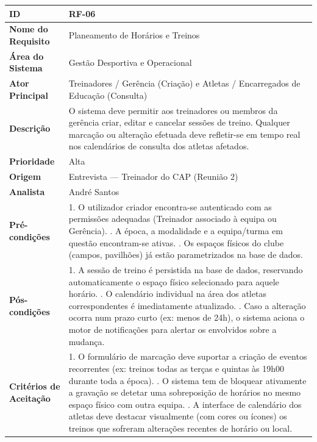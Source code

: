 {\begin{xltabular}{\textwidth}{|l|X|}
\textbf{ID} & RF-06 \\ \hline
\textbf{Nome do Requisito} & Planeamento de Horários e Treinos \\ \hline
\textbf{Área do Sistema} & Gestão Desportiva e Operacional \\ \hline
\textbf{Ator Principal} & Treinadores / Gerência (Criação) e Atletas / Encarregados de Educação (Consulta) \\ \hline
\textbf{Descrição} & O sistema deve permitir aos treinadores ou membros da gerência criar, editar e cancelar sessões de treino. Qualquer marcação ou alteração efetuada deve refletir-se em tempo real nos calendários de consulta dos atletas afetados. \\ \hline
\textbf{Prioridade} & Alta \\ \hline
\textbf{Origem} & Entrevista --- Treinador do CAP (Reunião 2) \\ \hline
\textbf{Analista} & André Santos \\ \hline
\textbf{Pré-condições} & 1. O utilizador criador encontra-se autenticado com as permissões adequadas (Treinador associado à equipa ou Gerência). . A época, a modalidade e a equipa/turma em questão encontram-se ativas. . Os espaços físicos do clube (campos, pavilhões) já estão parametrizados na base de dados. \\ \hline
\textbf{Pós-condições} & 1. A sessão de treino é persistida na base de dados, reservando automaticamente o espaço físico selecionado para aquele horário. . O calendário individual na área dos atletas correspondentes é imediatamente atualizado. . Caso a alteração ocorra num prazo curto (ex: menos de 24h), o sistema aciona o motor de notificações para alertar os envolvidos sobre a mudança. \\ \hline
\textbf{Critérios de Aceitação} & 1. O formulário de marcação deve suportar a criação de eventos recorrentes (ex: treinos todas as terças e quintas às 19h00 durante toda a época). . O sistema tem de bloquear ativamente a gravação se detetar uma sobreposição de horários no mesmo espaço físico com outra equipa. . A interface de calendário dos atletas deve destacar visualmente (com cores ou ícones) os treinos que sofreram alterações recentes de horário ou local. \\
\end{xltabular}
}


